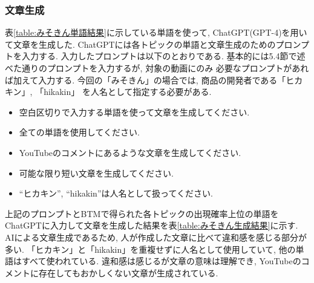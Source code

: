 \documentclass{ltjarticle}
\begin{document}
\subsubsection{文章生成}
表\ref{table:みそきん単語結果}に示している単語を使って, ChatGPT(GPT-4)を用いて文章を生成した. 
ChatGPTには各トピックの単語と文章生成のためのプロンプトを入力する. 
入力したプロンプトは以下のとおりである. 基本的には5.4節で述べた通りのプロンプトを入力するが, 対象の動画にのみ
必要なプロンプトがあれば加えて入力する. 今回の「みそきん」の場合では, 商品の開発者である「ヒカキン」, 「hikakin」
を人名として指定する必要がある. \\
\begin{itemize}
    \item 空白区切りで入力する単語を使って文章を生成してください.
    \item 全ての単語を使用してください.
    \item YouTubeのコメントにあるような文章を生成してください.
    \item 可能な限り短い文章を生成してください.
    \item ``ヒカキン'', ``hikakin''は人名として扱ってください.
\end{itemize}
\vspace{5truept}

上記のプロンプトとBTMで得られた各トピックの出現確率上位の単語をChatGPTに入力して文章を生成した結果を表\ref{table:みそきん生成結果}に示す. 
AIによる文章生成であるため, 人が作成した文章に比べて違和感を感じる部分が多い. 
「ヒカキン」と「hikakin」を重複せずに人名として使用していて, 他の単語はすべて使われている. 
違和感は感じるが文章の意味は理解でき, YouTubeのコメントに存在してもおかしくない文章が生成されている. 
\vspace{5truept}
\end{document}
